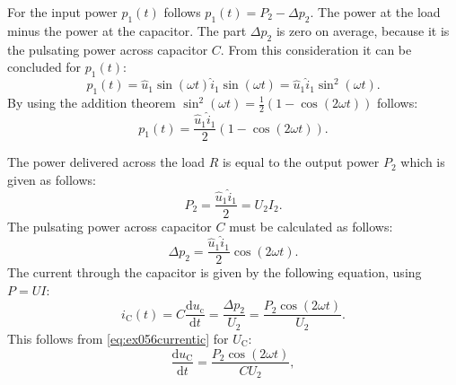 \begin{solutionblock}
    For the input power $p_\mathrm{1}(t)$ follows $p_\mathrm{1}(t)= P_\mathrm{2} -\Delta p_\mathrm{2}$. The power at the load minus the power at the capacitor. The part $\Delta p_\mathrm{2}$ is zero on average, because it is the pulsating power across capacitor $C$. From this consideration it can be concluded for $p_\mathrm{1}(t)$:
    \begin{equation}
        p_\mathrm{1}(t) = \hat u_\mathrm{1} \sin(\omega t) \hat i_\mathrm{1} \sin(\omega t) = \hat u_\mathrm{1} \hat i_\mathrm{1} \sin^2(\omega t).
    \end{equation}
    By using the addition theorem $\sin^2(\omega t) = \frac{1}{2}(1-\cos(2\omega t))$ follows:
    \begin{equation}
        p_\mathrm{1}(t) = \frac{\hat u_\mathrm{1} \hat i_\mathrm{1}}{2}(1-\cos(2\omega t)).
    \end{equation}

    The power delivered across the load $R$ is equal to the output power $P_\mathrm{2}$ which is given as follows:
    \begin{equation}
        P_\mathrm{2} = \frac{\hat u_\mathrm{1}\hat i_\mathrm{1}}{2} = U_\mathrm{2} I_\mathrm{2}.
    \end{equation}
    The pulsating power across capacitor $C$ must be calculated as follows:
    \begin{equation}
        \Delta p_\mathrm{2} = \frac{\hat u_\mathrm{1}\hat i_\mathrm{1}}{2} \cos(2\omega t).
    \end{equation}
    The current through the capacitor is given by the following equation, using $P = UI$:
    \begin{equation}
        i_\mathrm{C}(t)=C \frac{\mathrm{d}u_\mathrm{c}}{\mathrm{d}t} = \frac{\Delta p_\mathrm{2}}{U_\mathrm{2}} = \frac{P_\mathrm{2}\cos(2\omega t)}{U_\mathrm{2}}.\label{eq:ex056currentic}
    \end{equation}
    This follows from \eqref{eq:ex056currentic} for $U_\mathrm{C}$:
    \begin{equation}
        \frac{\mathrm{d}u_\mathrm{C}}{\mathrm{d}t} = \frac{P_\mathrm{2}\cos (2\omega t)}{C U_\mathrm{2}},
    \end{equation}


\end{solutionblock}

